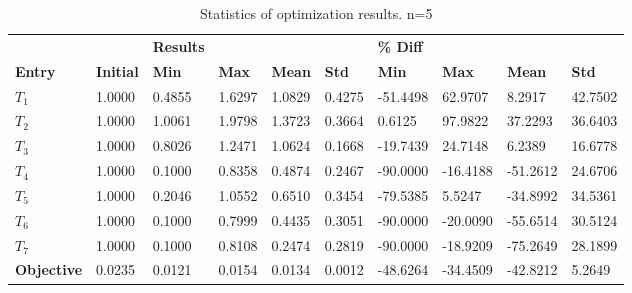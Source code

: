 \begin{table}[H]
\centering
\begin{tabular}{llllllllll}
\textbf{} & \textbf{} & \cellcolor[HTML]{EFEFEF}\textbf{Results} & \cellcolor[HTML]{EFEFEF} & \cellcolor[HTML]{EFEFEF} & \cellcolor[HTML]{EFEFEF} & \cellcolor[HTML]{EFEFEF}\textbf{\% Diff} & \cellcolor[HTML]{EFEFEF} & \cellcolor[HTML]{EFEFEF} & \cellcolor[HTML]{EFEFEF} \\
\rowcolor[HTML]{EFEFEF} 
\textbf{Entry} & \textbf{Initial} & \textbf{Min} & \textbf{Max} & \textbf{Mean} & \textbf{Std} & \textbf{Min} & \textbf{Max} & \textbf{Mean} & \textbf{Std} \\
$T_1$ & 1.0000 & 0.4855 & 1.6297 & 1.0829 & 0.4275 & -51.4498 & 62.9707 & 8.2917 & 42.7502 \\ 
$T_2$ & 1.0000 & 1.0061 & 1.9798 & 1.3723 & 0.3664 & 0.6125 & 97.9822 & 37.2293 & 36.6403 \\ 
$T_3$ & 1.0000 & 0.8026 & 1.2471 & 1.0624 & 0.1668 & -19.7439 & 24.7148 & 6.2389 & 16.6778 \\ 
$T_4$ & 1.0000 & 0.1000 & 0.8358 & 0.4874 & 0.2467 & -90.0000 & -16.4188 & -51.2612 & 24.6706 \\ 
$T_5$ & 1.0000 & 0.2046 & 1.0552 & 0.6510 & 0.3454 & -79.5385 & 5.5247 & -34.8992 & 34.5361 \\ 
$T_6$ & 1.0000 & 0.1000 & 0.7999 & 0.4435 & 0.3051 & -90.0000 & -20.0090 & -55.6514 & 30.5124 \\ 
$T_7$ & 1.0000 & 0.1000 & 0.8108 & 0.2474 & 0.2819 & -90.0000 & -18.9209 & -75.2649 & 28.1899 \\ 
\rowcolor[HTML]{EFEFEF} 
\textbf{Objective} & 0.0235 & 0.0121 & 0.0154 & 0.0134 & 0.0012 & -48.6264 & -34.4509 & -42.8212 & 5.2649 \\ 
\end{tabular}
\caption{Statistics of optimization results. n=5}
\label{tab:StatisticsOptimizationAnalysis}
\end{table}